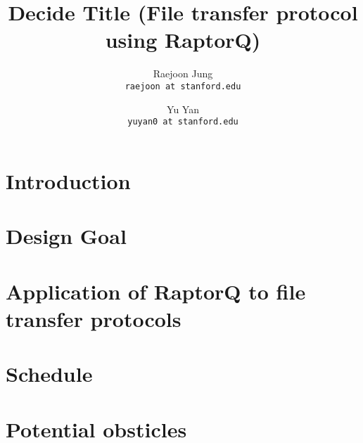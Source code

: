 \documentclass{sig-alternate-10pt}
\begin{document}
\title{Decide Title (File transfer protocol using RaptorQ)}
\author{
  Raejoon Jung\\
  \texttt{raejoon at stanford.edu}
  \and 
  Yu Yan\\
  \texttt{yuyan0 at stanford.edu}
}

\maketitle
\section{Introduction}

\section{Design Goal}

\section{Application of RaptorQ to file transfer protocols}

\section{Schedule}

\section{Potential obsticles}
\end{document}
